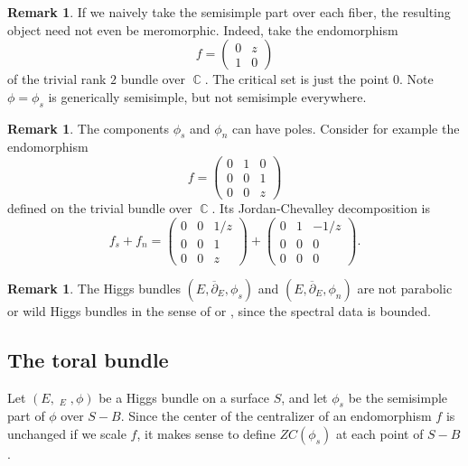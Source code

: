 \documentclass[10pt]{amsart}
\DeclareMathOperator{\dbar}{\overline{\partial}}
\theoremstyle{definition}
\newtheorem{remark}[thm]{Remark}
\DeclareMathOperator{\C}{\mathbb{C}}
\begin{document}
    \begin{remark}
    If we naively take the semisimple part over each fiber, the resulting object need not even be meromorphic. Indeed, take the endomorphism $$f=\begin{pmatrix} 0 & z \\ 1 & 0 \end{pmatrix}$$ of the trivial rank $2$ bundle over $\C$. The critical set is just the point $0$. Note $\phi=\phi_s$ is generically semisimple, but not semisimple everywhere. 
    \end{remark}

\begin{remark}
    The components $\phi_s$ and $\phi_n$ can have poles. Consider for example the endomorphism 
    $$f = 
    \begin{pmatrix}
    0 & 1 & 0 \\ 
    0 & 0 & 1 \\
    0 & 0 & z \end{pmatrix}
    $$
    defined on the trivial bundle over $\C$. Its Jordan-Chevalley decomposition is
    $$ f_s + f_n =
    \begin{pmatrix}
    0 & 0 & 1/z \\ 
    0 & 0 & 1 \\
    0 & 0 & z \end{pmatrix}
    +
    \begin{pmatrix}
    0 & 1 & -1/z \\ 
    0 & 0 & 0 \\
    0 & 0 & 0 \end{pmatrix}.
    $$
\end{remark}
\begin{remark}
    The Higgs bundles $(E,\overline{\partial}_E,\phi_s)$ and $(E,\overline{\partial}_E,\phi_n)$ are not parabolic or wild Higgs bundles in the sense of \cite{S} or \cite{BBo}, since the spectral data is bounded.
\end{remark}



\subsection{The toral bundle}
Let $(E, \dbar_E, \phi)$ be a Higgs bundle on a surface $S$, and let $\phi_s$ be the semisimple part of $\phi$ over $S-B$. Since the center of the centralizer of an endomorphism $f$ is unchanged if we scale $f$, it makes sense to define $ZC(\phi_s)$ at each point of $S-B$.
\end{document}
